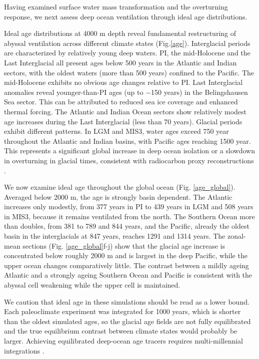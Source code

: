 \documentclass[pdflatex,sn-nature]{sn-jnl}
\begin{document}
Having examined surface water mass transformation and the overturning response, we next assess deep ocean ventilation through ideal age distributions.


Ideal age distributions at 4000 m depth reveal fundamental restructuring of abyssal ventilation across different climate states (Fig.\ref{age}). Interglacial periods are characterized by relatively young deep waters. PI, the mid-Holocene and the Last Interglacial all present ages below 500 years in the Atlantic and Indian sectors, with the oldest waters (more than 500 years) confined to the Pacific.  The mid-Holocene exhibits no obvious age changes relative to PI. Last Interglacial anomalies reveal younger-than-PI ages (up to $-$150 years) in the Belingshausen Sea sector. This can be attributed to reduced sea ice coverage and enhanced thermal forcing. The Atlantic and Indian Ocean sectors show relatively modest age increases during the Last Interglacial (less than 70 years). Glacial periods exhibit different patterns. In LGM and MIS3, water ages exceed 750 year throughout the Atlantic and Indian basins, with Pacific ages reaching 1500 year. This represents a significant global increase in deep ocean isolation or a slowdown in overturning in glacial times, consistent with radiocarbon proxy reconstructions \cite{Skinner2017}.

We now examine ideal age throughout the global ocean (Fig. \ref{age_global}). Averaged below 2000 m, the age is strongly basin dependent. The Atlantic increases only modestly, from 377 years in PI to 439 years in LGM and 508 years in MIS3, because it remains ventilated from the north. The Southern Ocean more than doubles, from 381 to 789 and 844 years, and the Pacific, already the oldest basin in the interglacials at 847 years, reaches 1291 and 1314 years. The zonal-mean sections (Fig. \ref{age_global}f-j) show that the glacial age increase is concentrated below roughly 2000 m and is largest in the deep Pacific, while the upper ocean changes comparatively little. The contrast between a mildly ageing Atlantic and a strongly ageing Southern Ocean and Pacific is consistent with the abyssal cell weakening while the upper cell is maintained.

We caution that ideal age in these simulations should be read as a lower bound. Each paleoclimate experiment was integrated for 1000 years, which is shorter than the oldest simulated ages, so the glacial age fields are not fully equilibrated and the true equilibrium contrast between climate states would probably be larger. Achieving equilibrated deep-ocean age tracers requires multi-millennial integrations \cite{Millet2025}.
\end{document}
